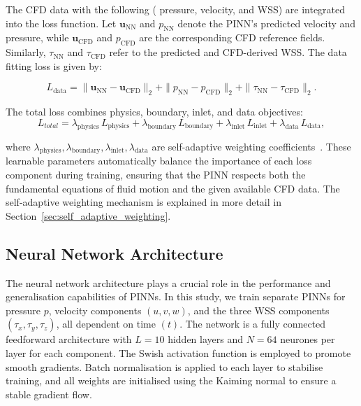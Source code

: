 \documentclass{article}
\begin{document}
The CFD data with the following ( pressure, velocity, and WSS) are integrated into the loss function. Let \(\mathbf{u}_{\mathrm{NN}}\) and \(p_{\mathrm{NN}}\) denote the PINN’s predicted velocity and pressure, while \(\mathbf{u}_{\mathrm{CFD}}\) and \(p_{\mathrm{CFD}}\) are the corresponding CFD reference fields. Similarly, \(\tau_{\mathrm{NN}}\) and \(\tau_{\mathrm{CFD}}\) refer to the predicted and CFD-derived WSS. The data fitting loss is given by:

\begin{equation}
L_{\mathrm{data}} = 
\|\mathbf{u}_{\mathrm{NN}} - \mathbf{u}_{\mathrm{CFD}}\|_2 
+ \|p_{\mathrm{NN}} - p_{\mathrm{CFD}}\|_2
+ \|\tau_{\mathrm{NN}} - \tau_{\mathrm{CFD}}\|_2.
\end{equation}

The total loss combines physics, boundary, inlet, and data objectives:
\begin{equation}
L_{total} = 
\lambda_{\mathrm{physics}}\,L_{\mathrm{physics}}
+ \lambda_{\mathrm{boundary}}\,L_{\mathrm{boundary}}
+ \lambda_{\mathrm{inlet}}\,L_{\mathrm{inlet}}
+ \lambda_{\mathrm{data}}\,L_{\mathrm{data}},
\label{eq:total_loss}
\end{equation}

where \(\lambda_{\mathrm{physics}}, \lambda_{\mathrm{boundary}}, \lambda_{\mathrm{inlet}}, \lambda_{\mathrm{data}}\) are self-adaptive weighting coefficients~\citep{mcclenny2020self}. These learnable parameters automatically balance the importance of each loss component during training, ensuring that the PINN respects both the fundamental equations of fluid motion and the given available CFD data. The self-adaptive weighting mechanism is explained in more detail in Section~\ref{sec:self_adaptive_weighting}. 

\subsection{Neural Network Architecture}
\label{sec:PINN_Architecture_Training}

The neural network architecture plays a crucial role in the performance and generalisation capabilities of PINNs. In this study, we train separate PINNs for pressure $p$, velocity components $(u, v, w)$, and the three WSS components $(\tau_x, \tau_y, \tau_z)$, all dependent on time $(t)$. The network is a fully connected feedforward architecture with $L=10$ hidden layers and $N=64$ neurones per layer for each component. The Swish activation function \citep{ramachandran2017searching} is employed to promote smooth gradients. Batch normalisation is applied to each layer to stabilise training, and all weights are initialised using the Kaiming normal \citep{he2015delving} to ensure a stable gradient flow.
\end{document}
